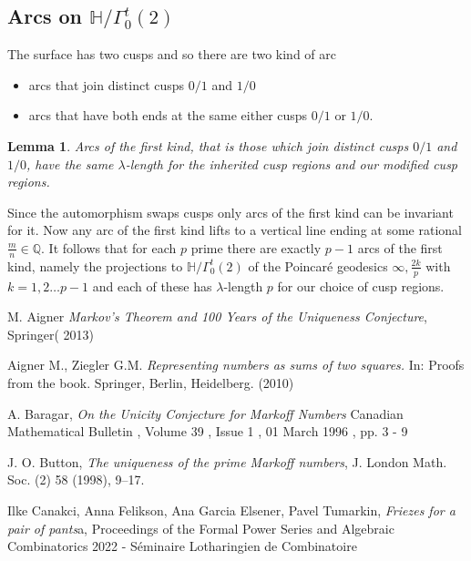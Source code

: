 \documentclass[12pt,a4paper]{amsart}
\newtheorem{lem}[thm]{Lemma}
\def\HH{\mathbb{H}}
\def\ah{\Gamma_0^t(2)}
\def\oot{\HH / \ah}
\def\QQ{\mathbb{Q}}
\begin{document}
\subsection{Arcs on $\oot$}

The surface has two cusps and so there are two kind of arc
\begin{itemize}
	\item arcs that join distinct cusps $0/1$ and $1/0$
	\item arcs that have both ends at the same either
		cusps $0/1$ or $1/0$.
\end{itemize}

\begin{lem}
Arcs of the first kind,
that is those which join distinct cusps $0/1$ and $1/0$,
have the same $\lambda$-length for the inherited
cusp regions and our modified cusp regions. 
\end{lem}


Since the automorphism swaps cusps only arcs of the first  kind can be invariant for it.
Now any arc of the first kind lifts to a vertical line ending at
some rational $\frac{m}{n}\in \QQ$.
It follows that for each  $p$  prime there are exactly $p-1$ arcs of the first kind,
namely the projections to $\oot$ of the Poincaré geodesics  $\infty,
\frac{2k}{p}$ with  $k = 1,2\ldots p-1$
and each of these has $\lambda$-length $p$ for our choice of cusp regions.



M. Aigner
\textit{Markov's Theorem and 100 Years of the Uniqueness Conjecture}, Springer( 2013)


Aigner M., Ziegler G.M.  
\textit{Representing numbers as sums of two squares.} In: Proofs from the book. Springer, Berlin, Heidelberg. (2010)

A. Baragar,
\textit{On the Unicity Conjecture for Markoff Numbers}
Canadian Mathematical Bulletin , Volume 39 , Issue 1 , 01 March 1996 , pp. 3 - 9

J. O. Button, 
\textit{The uniqueness of the prime Markoff numbers},
 J. London Math. Soc.
(2) 58 (1998), 9–17.

Ilke Canakci, Anna Felikson, Ana Garcia Elsener, Pavel Tumarkin,
\textit{Friezes for a pair of pants}a,
Proceedings of the Formal Power Series and Algebraic Combinatorics 2022 - Séminaire Lotharingien de Combinatoire
\end{document}
